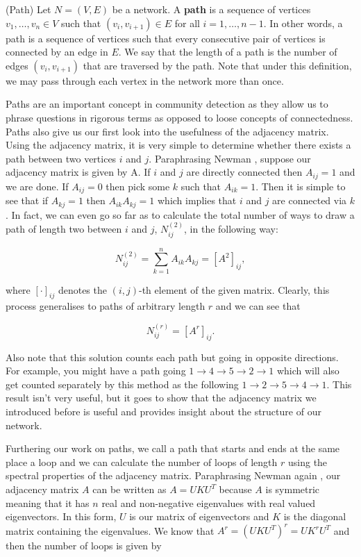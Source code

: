\begin{definition}{(Path)}
    Let $N = (V, E)$ be a network. A \textbf{path} is a sequence of vertices $v_1, \dots, v_n \in V$ such that $(v_i, v_{i+1}) \in E$ for all $i = 1, \dots, n-1$. In other words, a path is a sequence of vertices such that every consecutive pair of vertices is connected by an edge in $E$. We say that the length of a path is the number of edges $(v_i, v_{i+1})$ that are traversed by the path. Note that under this definition, we may pass through each vertex in the network more than once.
\end{definition}

Paths are an important concept in community detection as they allow us to phrase questions in rigorous terms as opposed to loose concepts of connectedness. Paths also give us our first look into the usefulness of the adjacency matrix. Using the adjacency matrix, it is very simple to determine whether there exists a path between two vertices $i$ and $j$. Paraphrasing Newman \cite[p. 137]{newman10}, suppose our adjacency matrix is given by A. If $i$ and $j$ are directly connected then $A_{ij} = 1$ and we are done. If $A_{ij} = 0$ then pick some $k$ such that $A_{ik} = 1$. Then it is simple to see that if $A_{kj} = 1$ then $A_{ik}A_{kj} = 1$ which implies that $i$ and $j$ are connected via $k$. In fact, we can even go so far as to calculate the total number of ways to draw a path of length two between $i$ and $j$, $N^{(2)}_{ij}$, in the following way:

$$
N_{ij}^{(2)} = \sum_{k=1}^n A_{ik}A_{kj} = [A^2]_{ij},
$$

\noindent
where $[\cdot]_{ij}$ denotes the $(i, j)$-th element of the given matrix. Clearly, this process generalises to paths of arbitrary length $r$ and we can see that

$$
N_{ij}^{(r)} = [A^r]_{ij}.
$$

\noindent
Also note that this solution counts each path but going in opposite directions. For example, you might have a path going $1 \rightarrow 4 \rightarrow 5 \rightarrow 2 \rightarrow 1$ which will also get counted separately by this method as the following $1 \rightarrow 2 \rightarrow 5 \rightarrow 4 \rightarrow 1$. This result isn't very useful, but it goes to show that the adjacency matrix we introduced before is useful and provides insight about the structure of our network. 

Furthering our work on paths, we call a path that starts and ends at the same place a loop and we can calculate the number of loops of length $r$ using the spectral properties of the adjacency matrix. Paraphrasing Newman again \cite[p. 137]{newman10}, our adjacency matrix $A$ can be written as $A = UKU^T$ because $A$ is symmetric meaning that it has $n$ real and non-negative eigenvalues with real valued eigenvectors. In this form, $U$ is our matrix of eigenvectors and $K$ is the diagonal matrix containing the eigenvalues. We know that $A^r = (UKU^T)^r = UK^rU^T$ and then the number of loops is given by

